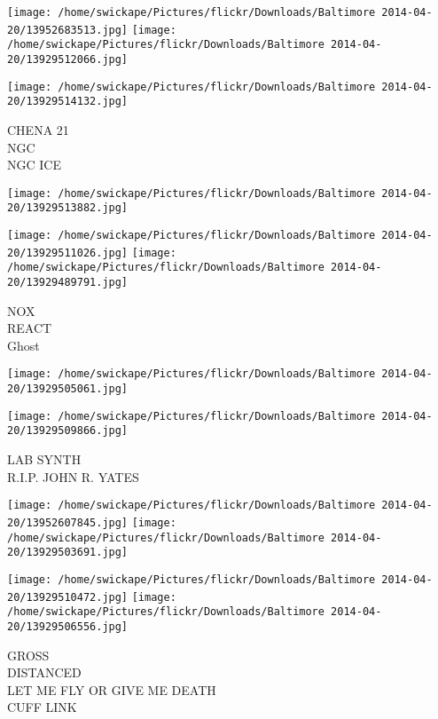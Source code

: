 \documentclass[10pt,letterpaper]{article}
\begin{document}
\texttt{[image: /home/swickape/Pictures/flickr/Downloads/Baltimore 2014-04-20/13952683513.jpg]}
\texttt{[image: /home/swickape/Pictures/flickr/Downloads/Baltimore 2014-04-20/13929512066.jpg]}

\vspace{0.25in}
\texttt{[image: /home/swickape/Pictures/flickr/Downloads/Baltimore 2014-04-20/13929514132.jpg]}

CHENA 21\\
NGC\\
NGC ICE\\
\pagebreak

\texttt{[image: /home/swickape/Pictures/flickr/Downloads/Baltimore 2014-04-20/13929513882.jpg]}

\vspace{0.25in}
\texttt{[image: /home/swickape/Pictures/flickr/Downloads/Baltimore 2014-04-20/13929511026.jpg]}
\texttt{[image: /home/swickape/Pictures/flickr/Downloads/Baltimore 2014-04-20/13929489791.jpg]}

NOX\\
REACT\\
Ghost\\
\pagebreak

\texttt{[image: /home/swickape/Pictures/flickr/Downloads/Baltimore 2014-04-20/13929505061.jpg]}

\vspace{0.25in}
\texttt{[image: /home/swickape/Pictures/flickr/Downloads/Baltimore 2014-04-20/13929509866.jpg]}

LAB SYNTH\\
R.I.P. JOHN R. YATES\\
\pagebreak

\texttt{[image: /home/swickape/Pictures/flickr/Downloads/Baltimore 2014-04-20/13952607845.jpg]}
\texttt{[image: /home/swickape/Pictures/flickr/Downloads/Baltimore 2014-04-20/13929503691.jpg]}

\texttt{[image: /home/swickape/Pictures/flickr/Downloads/Baltimore 2014-04-20/13929510472.jpg]}
\texttt{[image: /home/swickape/Pictures/flickr/Downloads/Baltimore 2014-04-20/13929506556.jpg]}

GROSS\\
DISTANCED\\
LET ME FLY OR GIVE ME DEATH\\
CUFF LINK\\
\pagebreak
\end{document}
